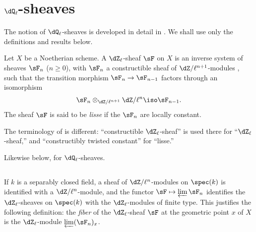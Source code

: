 \section{\texorpdfstring{$\dQ_\ell$}{Ql}-sheaves}\label{II:2}

The notion of $\dQ_\ell$-sheaves is developed in detail in
. We shall use only the definitions and results below.






\begin{definition_}\label{II:2-1}
Let $X$ be a Noetherian scheme. A $\dZ_\ell$-sheaf $\sF$ on $X$ is an
inverse system of sheaves $\sF_n$ ($n\geqslant 0$), with $\sF_n$ a
constructible sheaf of $\dZ/\ell^{n+1}$-modules , such that
the transition morphism $\sF_n\to\sF_{n-1}$ factors through an isomorphism
\[
  \sF_n\otimes_{\dZ/\ell^{n+1}} \dZ/\ell^n \iso \sF_{n-1}\text{.}
\]
The sheaf $\sF$ is said to be \emph{lisse} if the $\sF_n$ are locally
constant.
\end{definition_}

The terminology of  is different: ``constructible
$\dZ_\ell$-sheaf'' is used there for ``$\dZ_\ell$-sheaf,'' and
``constructibly twisted constant'' for ``lisse.''

Likewise below, for $\dQ_\ell$-sheaves.






\subsection{}\label{II:2-2}

If $k$ is a separably closed field, a sheaf of $\dZ/\ell^n$-modules on
$\spec(k)$ is identified with a $\dZ/\ell^n$-module, and the functor
$\sF\mapsto \varprojlim \sF_n$ identifies the $\dZ_\ell$-sheaves on
$\spec(k)$ with the $\dZ_\ell$-modules of finite type. This justifies the
following definition: the \emph{fiber} of the $\dZ_\ell$-sheaf $\sF$ at the
geometric point $x$ of $X$ is the $\dZ_\ell$-module
$\varprojlim (\sF_n)_x$.






\subsection{}\label{II:2-3}


